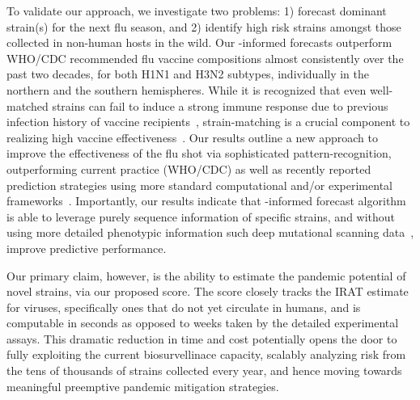 \documentclass[onecolumn, compsoc,10pt]{IEEEtran}
\begin{document}
To validate our approach, we investigate two problems: 1)  forecast dominant strain(s) for the next flu season, and 2)  identify high risk strains amongst those collected in non-human hosts in the wild. Our \enet-informed forecasts outperform  WHO/CDC recommended flu vaccine compositions almost consistently over the past two decades, for both H1N1 and H3N2 subtypes, individually in the northern and the southern hemispheres. While it is recognized that 
even well-matched strains can 
fail to induce a strong immune response due to previous infection history of vaccine recipients~\cite{cobey2018poor}, strain-matching is a crucial component to realizing high vaccine effectiveness~\cite{gouma2020antigenic}. Our results outline a new approach to improve the effectiveness of the flu shot via sophisticated  pattern-recognition, outperforming current practice (WHO/CDC) as well as  recently reported prediction strategies  using more standard computational and/or experimental frameworks~\cite{huddleston2020integrating,neher2014predicting}.
Importantly, our results indicate that \enet-informed forecast algorithm is able to leverage purely sequence information of specific strains, and without   using more detailed phenotypic information such deep mutational scanning data~\cite{huddleston2020integrating,neher2014predicting},  improve  predictive performance.


Our primary claim, however,  is the ability to estimate the pandemic potential of novel strains, via our proposed  \erisk score.  The \erisk score closely tracks  the IRAT estimate for  \infl  viruses, specifically ones that do not yet circulate in humans, and is computable in seconds as opposed to weeks taken by the detailed experimental assays. This dramatic reduction in time and cost potentially opens the door to fully exploiting the  current biosurvellinace capacity, scalably analyzing risk from  the tens of thousands of strains collected every year, and hence moving towards   meaningful preemptive pandemic mitigation strategies.
\end{document}
